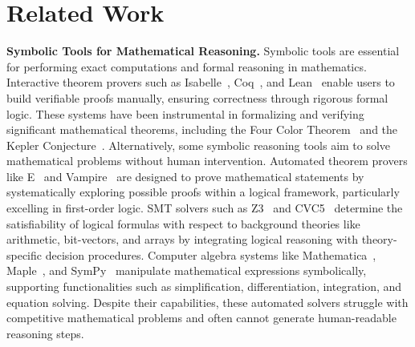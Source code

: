\section{Related Work}
\label{sec:related}

\textbf{Symbolic Tools for Mathematical Reasoning. }
Symbolic tools are essential for performing exact computations and formal reasoning in mathematics. Interactive theorem provers such as Isabelle~\citep{isabelle}, Coq~\citep{coq1996coq}, and Lean~\citep{de2015lean} enable users to build verifiable proofs manually, ensuring correctness through rigorous formal logic. These systems have been instrumental in formalizing and verifying significant mathematical theorems, including the Four Color Theorem~\citep{four} and the Kepler Conjecture~\citep{kepler}. Alternatively, some symbolic reasoning tools aim to solve mathematical problems without human intervention. Automated theorem provers like E~\citep{e} and Vampire~\citep{vampire} are designed to prove mathematical statements by systematically exploring possible proofs within a logical framework, particularly excelling in first-order logic. SMT solvers such as Z3~\citep{de2008z3} and CVC5~\citep{cvc5} determine the satisfiability of logical formulas with respect to background theories like arithmetic, bit-vectors, and arrays by integrating logical reasoning with theory-specific decision procedures. Computer algebra systems like Mathematica~\citep{Mathematica}, Maple~\citep{maple}, and SymPy~\citep{meurer2017sympy} manipulate mathematical expressions symbolically, supporting functionalities such as simplification, differentiation, integration, and equation solving. Despite their capabilities, these automated solvers struggle with competitive mathematical problems and often cannot generate human-readable reasoning steps.

